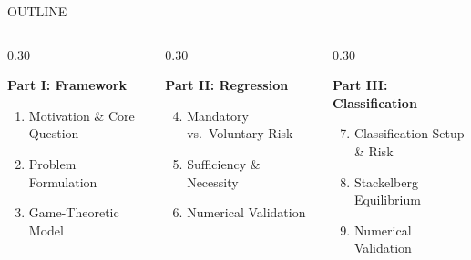 \documentclass[aspectratio=169, 10pt]{beamer}
\begin{document}
\begin{frame}{OUTLINE}
  \begin{columns}[T]
    \begin{column}{0.30\textwidth}
      \begin{block}{\centering \textbf{Part I: Framework}}
        \begin{enumerate}
          \item Motivation \& Core Question
          \item Problem Formulation
          \item Game-Theoretic Model
        \end{enumerate}
      \end{block}
    \end{column}
    \begin{column}{0.30\textwidth}
      \begin{alertblock}{\centering \textbf{Part II: Regression}}
        \begin{enumerate}\setcounter{enumi}{3}
          \item Mandatory vs.\ Voluntary Risk
          \item Sufficiency \& Necessity
          \item Numerical Validation
        \end{enumerate}
      \end{alertblock}
    \end{column}
    \begin{column}{0.30\textwidth}
      \begin{exampleblock}{\centering \textbf{Part III: Classification}}
        \begin{enumerate}\setcounter{enumi}{6}
          \item Classification Setup \& Risk
          \item Stackelberg Equilibrium
          \item Numerical Validation
        \end{enumerate}
      \end{exampleblock}
    \end{column}
  \end{columns}
  \vspace{10pt}
  \begin{center}
  \end{center}
\end{frame}
\end{document}

